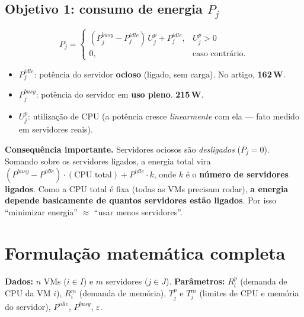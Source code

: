 \documentclass[11pt]{article}
\newcommand{\var}[1]{\textcolor{azul}{$#1$}}
\begin{document}
\subsection{Objetivo 1: consumo de energia \texorpdfstring{$P_j$}{Pj}}
\begin{equation*}
P_j=\begin{cases}(P^{busy}_j-P^{idle}_j)\,U^p_j+P^{idle}_j, & U^p_j>0\\[2pt]0,&\text{caso contrário.}\end{cases}
\end{equation*}
\begin{itemize}[leftmargin=1.4em,itemsep=1pt]
  \item \var{P^{idle}_j}: potência do servidor \textbf{ocioso} (ligado, sem
  carga). No artigo, \textbf{162\,W}.
  \item \var{P^{busy}_j}: potência do servidor em \textbf{uso pleno}.
  \textbf{215\,W}.
  \item \var{U^p_j}: utilização de CPU (a potência cresce \emph{linearmente} com
  ela — fato medido em servidores reais).
\end{itemize}
\begin{ideia}
\textbf{Consequência importante.} Servidores ociosos são \emph{desligados}
($P_j=0$). Somando sobre os servidores ligados, a energia total vira
$(P^{busy}-P^{idle})\cdot(\text{CPU total}) + P^{idle}\cdot k$, onde \var{k} é o
\textbf{número de servidores ligados}. Como a CPU total é fixa (todas as VMs
precisam rodar), \textbf{a energia depende basicamente de quantos servidores
estão ligados}. Por isso ``minimizar energia'' $\approx$ ``usar menos servidores''.
\end{ideia}

\section{Formulação matemática completa}
\textbf{Dados:} \var{n} VMs ($i\in I$) e \var{m} servidores ($j\in J$).
\textbf{Parâmetros:} \var{R^p_i} (demanda de CPU da VM $i$), \var{R^m_i} (demanda
de memória), \var{T^p_j} e \var{T^m_j} (limites de CPU e memória do servidor),
\var{P^{idle}}, \var{P^{busy}}, \var{\varepsilon}.
\end{document}
